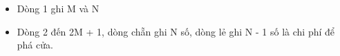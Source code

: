 \begin{itemize}
	\item Dòng 1 ghi M và N
	\item Dòng 2 đến 2M + 1, dòng chẵn ghi N số, dòng lẻ ghi N - 1 số là chi phí để phá cửa.
\end{itemize}